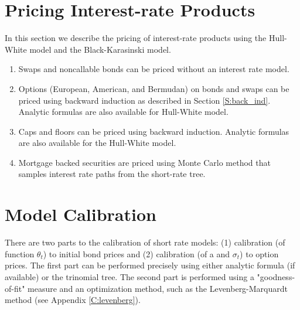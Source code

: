 \section{Pricing Interest-rate Products}
In this section we describe the pricing of interest-rate products using the
Hull-White model and the Black-Karasinski model.

\begin{enumerate}
\item Swaps and noncallable bonds can be priced without an interest rate model.


\item Options (European, American, and Bermudan) on bonds and swaps can be 
priced using backward induction as described in Section \ref{S:back_ind}.
Analytic formulas are also available for Hull-White model.

\item Caps and floors can be priced using backward induction. 
Analytic formulas are also available for the Hull-White model.


\item Mortgage backed securities are priced using Monte Carlo method that
samples interest rate paths from the short-rate tree.
\end{enumerate}


\section{Model Calibration}
There are two parts to the calibration of short rate models: (1) calibration (of 
function $\theta_t$) to initial bond prices and (2) calibration (of a and
$\sigma_t$) to option prices. The first part can be performed precisely using 
either analytic formula (if available) or the trinomial tree. The second part 
is performed using a "goodness-of-fit" measure and an optimization
method, such as the Levenberg-Marquardt method (see Appendix \ref{C:levenberg}).





